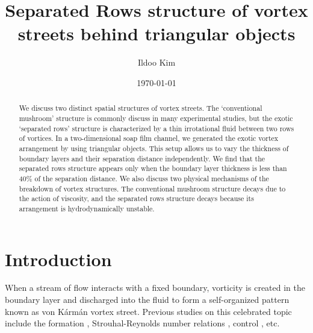 \documentclass[english, aps, prl, longbibliography, preprint]{revtex4-1}
\newcommand\citepar\citep
\begin{document}
\title{Separated Rows structure of vortex streets behind triangular objects}
\author{Ildoo Kim}
\date{\today}

\begin{abstract}
We discuss two distinct spatial structures of vortex streets.
The `conventional mushroom' structure is commonly discuss in many experimental studies, but the exotic `separated rows' structure is characterized by a thin irrotational fluid between two rows of vortices.
In a two-dimensional soap film channel, we generated the exotic vortex arrangement by using triangular objects.
This setup allows us to vary the thickness of boundary layers and their separation distance independently.
We find that the separated rows structure appears only when the boundary layer thickness is less than 40\% of the separation distance.
We also discuss two physical mechanisms of the breakdown of vortex structures. 
The conventional mushroom structure decays due to the action of viscosity, and the separated rows structure decays because its arrangement is hydrodynamically unstable.
\end{abstract}

\maketitle

\section{Introduction} 

When a stream of flow interacts with a fixed boundary, vorticity is created in the boundary layer and discharged into the fluid to form a self-organized pattern known as von K\'{a}rm\'{a}n vortex street.
Previous studies on this celebrated topic include the formation \citepar{Williamson:1996tn}, Strouhal-Reynolds number relations \citepar{Williamson:1998ti, Fey:1998vl, Roushan:2005un%
}, control \citepar{choi:2008bc}, etc.
\end{document}

